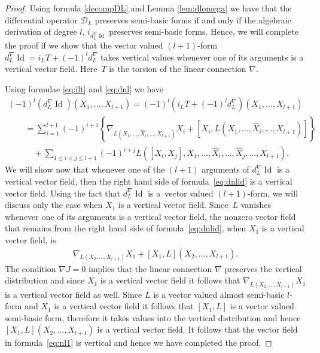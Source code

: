 \documentclass[pdftex]{sigma}
\numberwithin{equation}{section}
\begin{document}
\begin{proof}
Using formula \eqref{decompDL} and Lemma \ref{lem:dlomega} we have
that the dif\/ferential operator ${\mathcal D}_L$ preserves semi-basic forms
if and only if the algebraic derivation of degree $l$,
$i_{d^{\nabla}_L\operatorname{Id}}$ preserves semi-basic forms. Hence,
we will complete the proof if we show that the vector valued
$(l+1)$-form $d^{\nabla}_L\operatorname{Id}=i_LT+(-1)^ld^{\nabla}_L$
takes vertical values whenever one of its arguments is a vertical
vector f\/ield. Here~$T$ is the torsion of the linear connection $\nabla$.

Using formulae \eqref{eq:ilt} and \eqref{eq:dnl} we have
\begin{gather}
\nonumber   (-1)^l(d^{\nabla}_L\operatorname{Id})(X_1,\dots ,X_{l+1}) =(-1)^l(i_LT+(-1)^ld^{\nabla}_L)(X_1,\dots ,X_{l+1})
\\[-0.5ex] \nonumber
\qquad{}  =  \sum_{i=1}^{l+1}(-1)^{i+1}
\left\{\nabla_{L(X_1,\dots ,\hat{X}_i,\dots ,X_{l+1})}X_i + [X_i,
  L(X_1,\dots ,\hat{X}_i,\dots ,X_{l+1})]\right\} \\[-0.5ex]
 \qquad\quad{}  +  \sum_{1\leq i<j\leq
  l+1} (-1)^{i+j}L([X_i,X_j], X_1,\dots , \hat{X}_i,\dots , \hat{X}_j,\dots ,
X_{l+1}). \label{eq:dnlid}
\end{gather}
We will show now that whenever one of the
$(l+1)$ arguments of $d^{\nabla}_L\operatorname{Id}$ is a vertical
vector f\/ield, then the right hand side of formula~\eqref{eq:dnlid} is
a vertical vector f\/ield. Using the fact that $d^{\nabla}_L\operatorname{Id}$ is a~vector valued $(l+1)$-form, we will discuss only the case when $X_1$ is a vertical
vector f\/ield. Since~$L$ vanishes whenever one of its arguments is a
vertical vector f\/ield, the nonzero vector f\/ield that remains from the
right hand side of formula~\eqref{eq:dnlid}, when $X_1$ is a vertical
vector f\/ield, is
\begin{gather}
\nabla_{L(X_2,\dots ,X_{l+1})}X_1+[X_1,L](X_2,\dots ,X_{l+1}). \label{eq:nl1}
\end{gather} The condition $\nabla J=0$ implies that the linear
connection $\nabla$ preserves the vertical distribution and since $X_1$ is a vertical
vector f\/ield it follows that $\nabla_{L(X_2,\dots,X_{l+1})}X_1 $ is a
vertical vector f\/ield as well. Since $L$ is a vector valued almost
semi-basic $l$-form and $X_1$ is a vertical
vector f\/ield it follows that $[X_1, L]$ is a vector valued semi-basic
form, therefore it takes values into the vertical distribution and
hence  $[X_1,L](X_2,\dots ,X_{l+1})$ is a vertical vector f\/ield. It
follows that the vector f\/ield in formula~\eqref{eq:nl1} is vertical
and hence we have completed the proof.
\end{proof}
\end{document}
